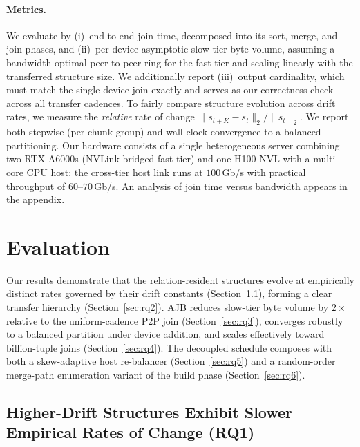 \documentclass{article}
\begin{document}
\paragraph{Metrics.}
We evaluate by (i)~end-to-end join time, decomposed into its sort, merge, and
join phases, and (ii)~per-device asymptotic slow-tier byte volume, assuming a
bandwidth-optimal peer-to-peer ring for the fast tier and scaling linearly with
the transferred structure size. We additionally report (iii)~output cardinality,
which must match the single-device join exactly and serves as our correctness
check across all transfer cadences. To fairly compare structure evolution across
drift rates, we measure the \emph{relative} rate of change
$\|s_{t+K} - s_t\|_2 / \|s_t\|_2$. We report both stepwise (per chunk group) and
wall-clock convergence to a balanced partitioning. Our hardware consists of a
single heterogeneous server combining two RTX A6000s (NVLink-bridged fast tier)
and one H100 NVL with a multi-core CPU host; the cross-tier host link runs at
$100$\,Gb/s with practical throughput of $60$--$70$\,Gb/s. An analysis of join
time versus bandwidth appears in the appendix.

\section{Evaluation}
\label{sec:evaluation}

Our results demonstrate that the relation-resident structures evolve at
empirically distinct rates governed by their drift constants
(Section~\ref{sec:rq1}), forming a clear transfer hierarchy
(Section~\ref{sec:rq2}). AJB reduces slow-tier byte volume by $2\times$ relative
to the uniform-cadence P2P join (Section~\ref{sec:rq3}), converges robustly to a
balanced partition under device addition, and scales effectively toward
billion-tuple joins (Section~\ref{sec:rq4}). The decoupled schedule composes with
both a skew-adaptive host re-balancer (Section~\ref{sec:rq5}) and a random-order
merge-path enumeration variant of the build phase (Section~\ref{sec:rq6}).

\subsection{Higher-Drift Structures Exhibit Slower Empirical Rates of Change (RQ1)}
\label{sec:rq1}
\end{document}
